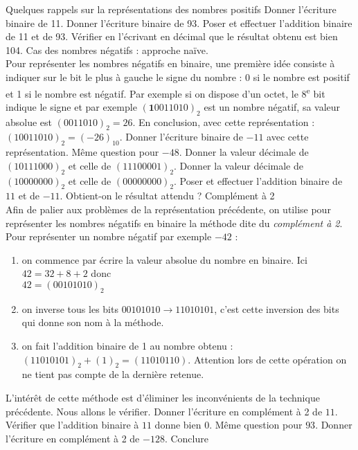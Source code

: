 \documentclass[11pt,a4paper]{article}
\begin{document}
\begin{Exercise}[title={Compter avec des 0 et des 1}]


\Question Quelques rappels sur la représentations des nombres positifs
\subQuestion Donner l'écriture binaire de 11. 
\subQuestion Donner l'écriture binaire de 93.
\subQuestion Poser et effectuer l'addition binaire de 11 et de 93.
\subQuestion Vérifier en l'écrivant en décimal que le résultat obtenu est bien 104.
\Question Cas des nombres négatifs : approche naïve. \\
Pour représenter les nombres négatifs en binaire, une première idée consiste à indiquer sur le bit le plus à gauche le signe du nombre : 0 si le nombre est positif et 1 si le nombre est négatif. Par exemple si on dispose d'un octet, le 8\textsuperscript{e} bit indique le signe et par exemple $(\textbf{1}0011010)_2$ est un nombre négatif, sa valeur absolue est $(0011010)_2=26$. En conclusion, avec cette représentation : $(10011010)_2 = (-26)_{10}$.
\subQuestion Donner l'écriture binaire de $-11$ avec cette représentation. Même question pour $-48$.
\subQuestion Donner la  valeur décimale de $(10111000)_2$ et celle de $(11100001)_2$.
\subQuestion Donner la  valeur décimale de $(10000000)_2$ et celle de $(00000000)_2$.
\subQuestion Poser et effectuer l'addition binaire de $11$ et de $-11$. Obtient-on le résultat attendu ?
\Question Complément à 2 \\
Afin de palier aux problèmes de la représentation précédente, on utilise pour représenter les nombres négatifs en binaire la méthode dite du \textit{complément à 2}. Pour représenter un nombre négatif par exemple $-42$ :
\begin{enumerate}
\item on commence par écrire la valeur absolue du nombre en binaire. Ici $42 = 32 + 8  + 2$ donc \\$42 = (00101010)_2$
\item on inverse tous les bits  $00101010 \longrightarrow 11010101$, c'est cette inversion des bits qui donne son nom à la méthode.
\item on fait l'addition binaire de 1 au nombre obtenu : $(11010101)_2 + (1)_2 = (11010110)$. Attention lors de cette opération on ne tient pas compte de la dernière retenue.
\end{enumerate}
L'intérêt de cette méthode est d'éliminer les inconvénients de la technique précédente. Nous allons le vérifier.
\subQuestion Donner l'écriture en complément à 2 de $11$. Vérifier que l'addition binaire à $11$ donne bien $0$.
\subQuestion Même question pour $93$.
\subQuestion Donner l'écriture en complément à 2 de $-128$.
\subQuestion Conclure
\end{Exercise}
\end{document}
